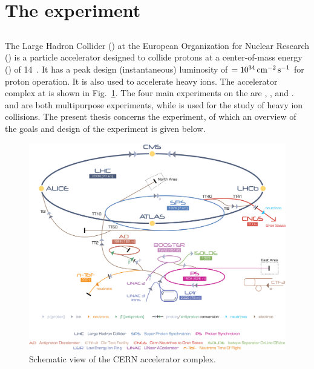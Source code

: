 \section{The \lhcb experiment}
\label{sec:lhcb}


\subsection{\lhc}
\label{sec:lhcb:lhc}

The Large Hadron Collider (\lhc) at the European Organization for Nuclear Research (\cern) is a particle accelerator designed to collide protons at a center-of-mass energy (\sqs) of 14\tev~\cite{lhc}. It has a peak design (instantaneous) luminosity of \lum$= 10^{34}\mathrm{ \,cm}^{-2}\mathrm{{\,s}}^{-1}$ for proton operation. It is also used to accelerate heavy ions. The accelerator complex at \cern is shown in Fig.~\ref{fig:lhc}. The four main experiments on the \lhc are \atlas, \cms, \lhcb and \alice. \atlas and \cms are both multipurpose experiments, while \alice is used for the study of heavy ion collisions. The present thesis concerns the \lhcb experiment, of which an overview of the goals and design of the experiment is given below.

\begin{figure}[!b]
\centering
\includegraphics[width=\textwidth]{figs/detector/lhc.jpg}
\caption{Schematic view of the CERN accelerator complex.}
\label{fig:lhc}
\end{figure}


